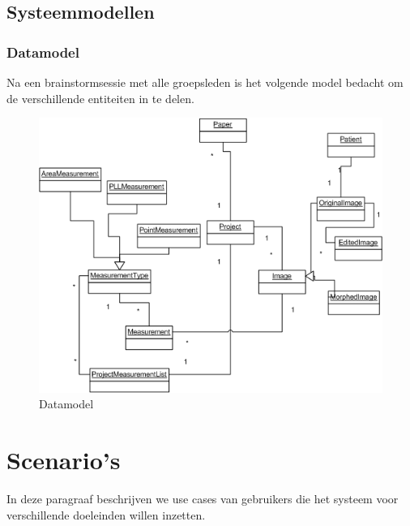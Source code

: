 \subsection{Systeemmodellen}
\subsubsection{Datamodel}
Na een brainstormsessie met alle groepsleden is het volgende model bedacht om de verschillende entiteiten in te delen.
\begin{figure}[htp]
\begin{center}
	\includegraphics[scale=0.65]{brainstorm_klassediagram}
\caption{Datamodel}
\label{default}
\end{center}
\end{figure}


\section{Scenario's}

In deze paragraaf beschrijven we use cases van gebruikers die het systeem voor verschillende doeleinden willen inzetten.

